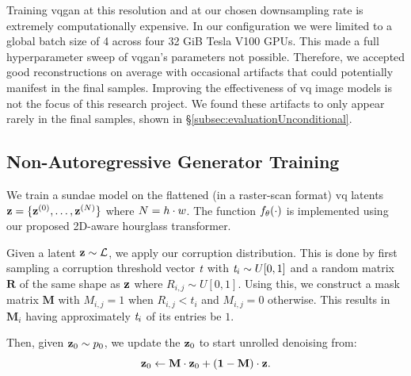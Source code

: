 Training \gls{vqgan} at this resolution and at our chosen downsampling rate is
extremely computationally expensive. In our configuration we were limited to a
global batch size of 4 across four 32 GiB Tesla V100 GPUs. This made a full
hyperparameter sweep of \gls{vqgan}'s parameters not possible. Therefore, we
accepted good reconstructions on average with occasional artifacts that could
potentially manifest in the final samples. Improving the effectiveness of \gls{vq}
image models is not the focus of this research project. We
found these artifacts to only appear rarely in the final samples, shown in
\S\ref{subsec:evaluationUnconditional}.

\subsection{Non-Autoregressive Generator Training}
\label{subsec:sundaeTraining}

We train a \gls{sundae} model on the flattened (in a raster-scan format)
\gls{vq} latents $\mathbf{z} = \{\mathbf{z}^{(0)}, \dots, \mathbf{z}^{(N)}\}$
where $N = h \cdot w$. The function $f_\theta(\cdot)$ is
implemented using our proposed 2D-aware hourglass transformer. 

Given a latent $\mathbf{z} \sim \mathcal{L}$, we apply our corruption
distribution. This is done by first sampling a corruption threshold vector
$\textit{t}$ with $\textit{t}_i \sim U[0, 1]$ and a random
matrix $\mathbf{R}$ of the same shape as $\mathbf{z}$ where $R_{i,j} \sim U[0,1]$.
Using this, we construct a mask matrix $\mathbf{M}$ with $M_{i,j} = 1$ when
$R_{i,j} < t_i$ and $M_{i,j} = 0$ otherwise. This results in $\mathbf{M}_i$ having
approximately $\textit{t}_i$ of its entries be $1$.

Then, given $\mathbf{z}_0 \sim p_0$, we update the $\mathbf{z}_0$ to start unrolled
denoising from:
\begin{equation}
    \mathbf{z}_0 \leftarrow \mathbf{M} \cdot \mathbf{z}_0 + (\mathbf{1} - \mathbf{M})
    \cdot \mathbf{z} \text{.}
\end{equation}

